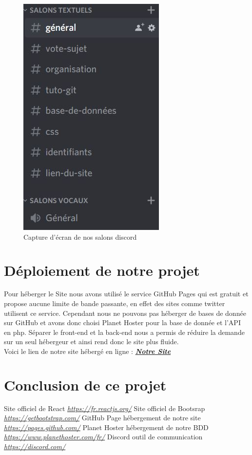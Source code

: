 \documentclass[12pt]{report}
\begin{document}
	\begin{figure}[h!]
	\begin{center}
		\includegraphics[scale=0.5]{discord.jpg}
	\end{center}
		\caption{Capture d'écran de nos salons discord}
\end{figure}

\section{Déploiement de notre projet}
Pour héberger le Site nous avons utilisé le service GitHub\cite{GitHub} Pages qui est gratuit et propose aucune limite de bande passante, en effet des sites comme twitter utilisent ce service.
Cependant nous  ne pouvons pas héberger de bases de donnée sur GitHub et avons donc choisi Planet Hoster\cite{Planet} pour la base de donnée et l'API en php. Séparer le front-end et la back-end nous a permis de réduire la demande sur un seul hébergeur et ainsi rend donc le site plus fluide.\\
Voici le lien de notre site hébergé en ligne :
\href{https://florentbednarek.github.io/projetwebEISTI}{\textbf{\emph{Notre Site}}}
\clearpage
\section{Conclusion de ce projet}

			\begin{thebibliography}{10}
			Site officiel de React
			\emph{\href{https://fr.reactjs.org/}{https://fr.reactjs.org/}}
			Site officiel de Bootsrap
			\emph{\href{https://getbootstrap.com/}{https://getbootstrap.com/}}
			GitHub Page hébergement de notre site
			\emph{\href{https://pages.github.com/}{https://pages.github.com/}} 
			Planet Hoster hébergement de notre BDD
			\emph{\href{https://www.planethoster.com/fr/}{https://www.planethoster.com/fr/}}
			Discord outil de communication
			\emph{\href{https://discord.com/}{https://discord.com/}}
		\end{thebibliography}
\end{document}
